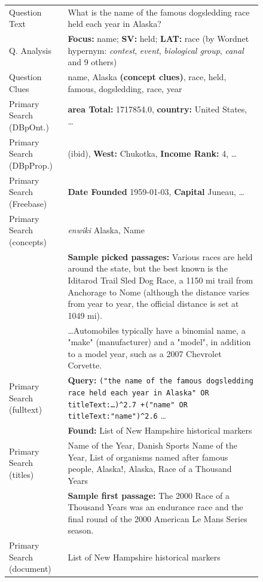 \begin{figure}[t!]
\renewcommand{\arraystretch}{1.3}
\centering
\footnotesize
\begin{tabular}{|p{1.8cm}p{6cm}|}
\hline
Question Text & What is the name of the famous dogsledding race held each year in Alaska? \\
Q. Analysis & \textbf{Focus:} name; \textbf{SV:} held; \textbf{LAT:} race
	(by Wordnet hypernym: \textit{contest}, \textit{event}, \textit{biological group}, \textit{canal} and 9 others) \\
Question Clues & name, Alaska \textbf{(concept clues)}, race, held, famous, dogsledding, race, year \\ \hline

Primary Search (DBpOnt.) & \textbf{area Total:} 1717854.0, \textbf{country:} United States, \dots \\
Primary Search (DBpProp.) & (ibid), \textbf{West:} Chukotka, \textbf{Income Rank:} 4, \dots \\
Primary Search (Freebase) & \textbf{Date Founded} 1959-01-03, \textbf{Capital} Juneau, \dots \\
Primary Search (concepts) & \textit{enwiki} Alaska, Name \\
	& \textbf{Sample picked passages:} Various races are held around the state, but the best known is the Iditarod Trail Sled Dog Race, a 1150 mi trail from Anchorage to Nome (although the distance varies from year to year, the official distance is set at 1049 mi). \\
	& \dots Automobiles typically have a binomial name, a "make" (manufacturer) and a "model", in addition to a model year, such as a 2007 Chevrolet Corvette.\\
Primary Search (fulltext) & \textbf{Query:} \texttt{("the name of the famous dogsledding race held each year in Alaska" OR titleText:\dots)\^{}2.7 +("name" OR titleText:"name")\^{}2.6} \dots \\
	& \textbf{Found:} List of New Hampshire historical markers \\
Primary Search (titles) & Name of the Year, Danish Sports Name of the Year, List of organisms named after famous people, Alaska!, Alaska, Race of a Thousand Years \\
	& \textbf{Sample first passage:} The 2000 Race of a Thousand Years was an endurance race and the final round of the 2000 American Le Mans Series season. \\
Primary Search (document) & List of New Hampshire historical markers \\ \hline


\end{tabular}
\end{figure}
